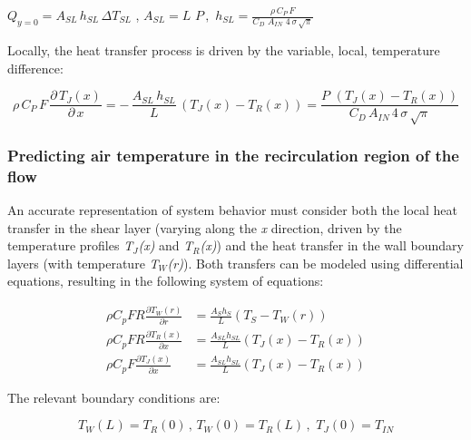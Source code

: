 \({Q_{y = 0}} = {A_{SL}}\,{h_{SL}}\,\Delta {T_{SL}}\) , \({A_{SL}} = L\,\,P\,,\,\,{h_{SL}} = \frac{{\rho \,{C_P}\,F}}{{{C_D}\,\,{A_{IN}}\,\,4\,\sigma \,\sqrt \pi }}\)

Locally, the heat transfer process is driven by the variable, local, temperature difference:

\begin{equation}
\rho \,{C_P}\,F\,\frac{{\partial \,{T_J}(x)}}{{\partial \,x}} =  - \,\frac{{{A_{SL}}\,{h_{SL}}}}{L}\,\left( {{T_J}(x) - {T_R}(x)} \right) = \frac{{P\,\,\left( {{T_J}(x) - {T_R}(x)} \right)}}{{{C_D}\,{A_{IN}}\,4\,\sigma \,\sqrt \pi  }}
\end{equation}

\subsubsection{Predicting air temperature in the recirculation region of the flow}\label{predicting-air-temperature-in-the-recirculation-region-of-the-flow}

An accurate representation of system behavior must consider both the local heat transfer in the shear layer (varying along the \emph{x} direction, driven by the temperature profiles \emph{T\(_{J}\)(x)} and \emph{T\(_{R}\)(x)}) and the heat transfer in the wall boundary layers (with temperature \emph{T\(_{W}\)(r)}). Both transfers can be modeled using differential equations, resulting in the following system of equations:

\begin{equation}
  \begin{array}{rl}
    \rho C_p F R \frac{\partial T_W \left(r\right)}{\partial r} & = \frac{A_S h_S}{L} \left(T_S - T_W \left(r\right)\right) \\
    \rho C_p F R \frac{\partial T_R \left(x\right)}{\partial x} & = \frac{A_{SL} h_{SL}}{L} \left(T_J\left(x\right) - T_R \left(x\right)\right) \\
    \rho C_p F \frac{\partial T_J \left(x\right)}{\partial x} & = \frac{A_{SL} h_{SL}}{L} \left(T_J\left(x\right) - T_R \left(x\right)\right) 
  \end{array}
\end{equation}

The relevant boundary conditions are:

\begin{equation}
{T_W}({L_{}}) = {T_R}(0)\,,\,{T_W}(0) = {T_R}(L)\,,\,\,{T_J}(0) = {T_{IN}}
\end{equation}

